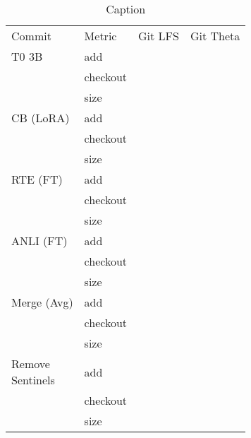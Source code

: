 \begin{table*}[]
    \centering
    \begin{tabular}{l l | r r}
      Commit & Metric & Git LFS & Git Theta \\
      \hhline{==|==}
      T0 3B            & add      & & \\
                       & checkout & & \\
                       & size     & & \\
      \hline
      CB (LoRA)        & add      & & \\
                       & checkout & & \\
                       & size     & & \\
      \hline
      RTE (FT)         & add      & & \\
                       & checkout & & \\
                       & size     & & \\
      \hline
      ANLI (FT)        & add      & & \\
                       & checkout & & \\
                       & size     & & \\
      \hline
      Merge (Avg)      & add      & & \\
                       & checkout & & \\
                       & size     & & \\
      \hline
      \shortstack{Remove \\ Sentinels} & add      & & \\
                       & checkout & & \\
                       & size     & & \\
    
    \end{tabular}
    \caption{Caption}
    \label{tab:benchmark}
\end{table*}